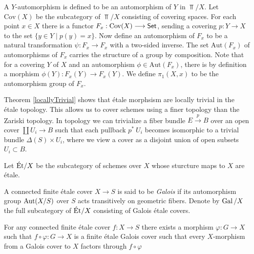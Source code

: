 A $Y$-automorphism is defined to be an automorphism of $Y$ in $\Top/X$. Let $\text{Cov}(X)$ be the subcategory of $\Top/X$ consisting of covering spaces. For each point $x \in X$ there is a functor $F_x: \text{Cov}(X) \longrightarrow \mathsf{Set}$, sending a covering $p: Y \to X$ to the set $\{y \in Y \mid p(y) = x\}$. Now define an automorphism of $F_x$ to be a natural transformation $\psi: F_x \to F_x$ with a two-sided inverse. The set $\text{Aut}(F_x)$ of automorphisms of $F_x$ carries the structure of a group by composition. Note that for a covering $Y$ of $X$ and an automorphism $\phi \in \text{Aut}(F_x)$, there is by definition a morphism $\phi(Y): F_x(Y) \to F_x(Y)$. We define $\pi_1(X,x)$ to be the automorphism group of $F_x$.

\begin{remark}
	Theorem \ref{locallyTrivial} shows that \'etale morphsism are locally trivial in the \'etale topology. This allows us to cover schemes using a finer topology than the Zariski topology. In topology we can trivialize a fiber bundle $E \stackrel{p}{\to} B$ over an open cover $\coprod U_i \to B$ such that each pullback $p^*\ U_i $ becomes isomorphic to a trivial bundle $\Delta(S) \times U_i$, where we view a cover as a disjoint union of open subsets $U_i \subset B$.
\end{remark}

\begin{definition}
	Let $\text{\'Et}/X$ be the subcategory of schemes over $X$ whose sturcture maps to $X$ are \'etale.
\end{definition}

\begin{definition}
	A connected finite \'etale cover $X \to S$ is said to be \textit{Galois} if its automorphism group $\operatorname{Aut}(X/S)$ over $S$ acts transitively on geometric fibers. Denote by $\operatorname{Gal}/X$ the full subcategory of $\text{\'Et}/X$ consisting of Galois \'etale covers.
\end{definition}

\begin{proposition}\label{prop:galois_cover_construction}
	For any connected finite \'etale cover $f \colon X \to S$ there exists a morphism $\varphi \colon G \to X$ such that $f \circ \varphi \colon G \to X$ is a finite \'etale Galois cover such that every $X$-morphism from a Galois cover to $X$ factors through $f \circ \varphi$
\end{proposition}

